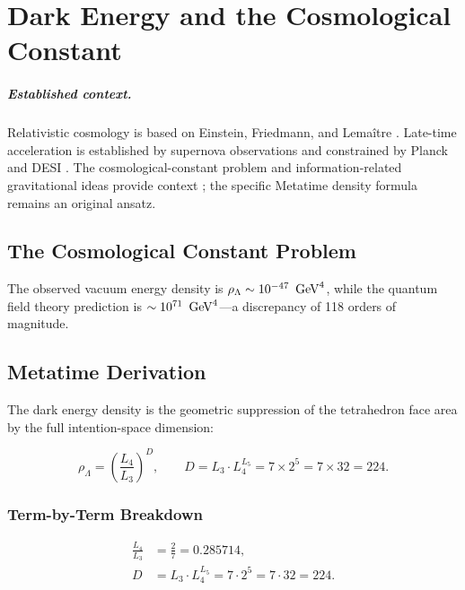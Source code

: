 \chapter{Dark Energy and the Cosmological Constant}
\label{ch:dark_energy}


\paragraph{Established context.}
Relativistic cosmology is based on Einstein, Friedmann, and Lema\^itre
\cite{Einstein1915,Friedmann1922,Lemaitre1927}.  Late-time acceleration is
established by supernova observations and constrained by Planck and DESI
\cite{Riess1998,Perlmutter1999,Planck2018,DESI2024}.  The cosmological-constant
problem and information-related gravitational ideas provide context
\cite{Weinberg1989CC,Carroll2001,Bekenstein1973,Hawking1975,Jacobson1995}; the
specific Metatime density formula remains an original ansatz.

\section{The Cosmological Constant Problem}

The observed vacuum energy density is \(\rho_\Lambda \sim 10^{-47}\ \,\text{GeV}^4\),
while the quantum field theory prediction is \(\sim 10^{71}\ \,\text{GeV}^4\)---a
discrepancy of 118 orders of magnitude.

\section{Metatime Derivation}

The dark energy density is the geometric suppression of the tetrahedron
face area by the full intention-space dimension:

\[
\rho_\Lambda = \left(\frac{L_4}{L_3}\right)^{\!D},
\qquad
D = L_3 \cdot L_4^{L_5} = 7 \times 2^5 = 7 \times 32 = 224.
\]

\subsection{Term-by-Term Breakdown}

\[
\begin{aligned}
\frac{L_4}{L_3} &= \frac{2}{7} = 0.285714, \\
D &= L_3 \cdot L_4^{L_5}
   = 7 \cdot 2^5
   = 7 \cdot 32
   = 224.
\end{aligned}
\]

